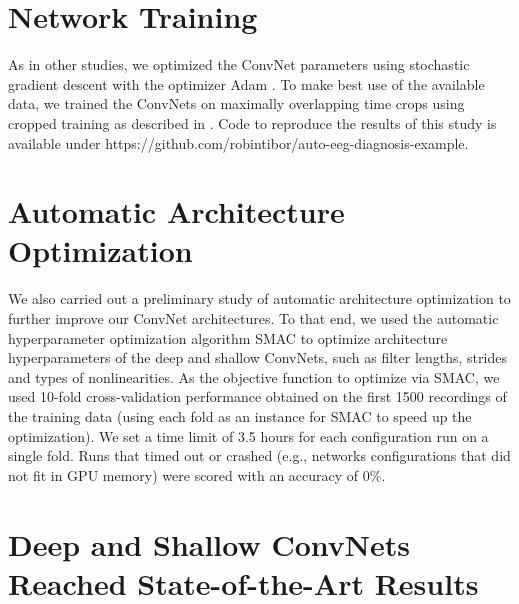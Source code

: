 \section{Network Training}\label{network-training}

    As in other studies, we optimized the ConvNet parameters using
stochastic gradient descent with the optimizer Adam
\cite{kingma_adam:_2014}. To make best use of the available
data, we trained the ConvNets on maximally overlapping time crops using
cropped training as described in . Code
to reproduce the results of this study is available under
https://github.com/robintibor/auto-eeg-diagnosis-example.

\section{Automatic Architecture
Optimization}\label{automatic-architecture-optimization}

    We also carried out a preliminary study of automatic architecture
optimization to further improve our ConvNet architectures. To that end,
we used the automatic hyperparameter optimization algorithm SMAC
\citep{hutter_sequential_2011} to optimize architecture
hyperparameters of the deep and shallow ConvNets, such as filter
lengths, strides and types of nonlinearities. As the objective function
to optimize via SMAC, we used 10-fold cross-validation performance
obtained on the first 1500 recordings of the training data (using each
fold as an instance for SMAC to speed up the optimization). We set a
time limit of 3.5 hours for each configuration run on a single fold.
Runs that timed out or crashed (e.g., networks configurations that did
not fit in GPU memory) were scored with an accuracy of 0\%.

\section{Deep and Shallow ConvNets Reached State-of-the-Art
Results}\label{deep-and-shallow-convnets-reached-state-of-the-art-results}

